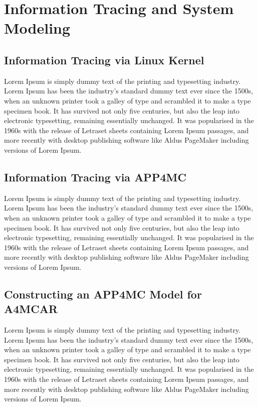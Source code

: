 \chapter{Information Tracing and System Modeling}
\section{Information Tracing via Linux Kernel}
Lorem Ipsum is simply dummy text of the printing and typesetting industry. Lorem Ipsum has been the industry's standard dummy text ever since the 1500s, when an unknown printer took a galley of type and scrambled it to make a type specimen book. It has survived not only five centuries, but also the leap into electronic typesetting, remaining essentially unchanged. It was popularised in the 1960s with the release of Letraset sheets containing Lorem Ipsum passages, and more recently with desktop publishing software like Aldus PageMaker including versions of Lorem Ipsum.

\section{Information Tracing via APP4MC}
Lorem Ipsum is simply dummy text of the printing and typesetting industry. Lorem Ipsum has been the industry's standard dummy text ever since the 1500s, when an unknown printer took a galley of type and scrambled it to make a type specimen book. It has survived not only five centuries, but also the leap into electronic typesetting, remaining essentially unchanged. It was popularised in the 1960s with the release of Letraset sheets containing Lorem Ipsum passages, and more recently with desktop publishing software like Aldus PageMaker including versions of Lorem Ipsum.

\section{Constructing an APP4MC Model for A4MCAR}
Lorem Ipsum is simply dummy text of the printing and typesetting industry. Lorem Ipsum has been the industry's standard dummy text ever since the 1500s, when an unknown printer took a galley of type and scrambled it to make a type specimen book. It has survived not only five centuries, but also the leap into electronic typesetting, remaining essentially unchanged. It was popularised in the 1960s with the release of Letraset sheets containing Lorem Ipsum passages, and more recently with desktop publishing software like Aldus PageMaker including versions of Lorem Ipsum.

